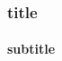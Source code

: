 \documentclass[
    aspectratio = 169
]{beamer}
\begin{document}
\begin{frame}
\frametitle{title}
\framesubtitle{subtitle}
 \lipsum[1]
 \note{\lipsum[1]}
\end{frame}
\end{document}

